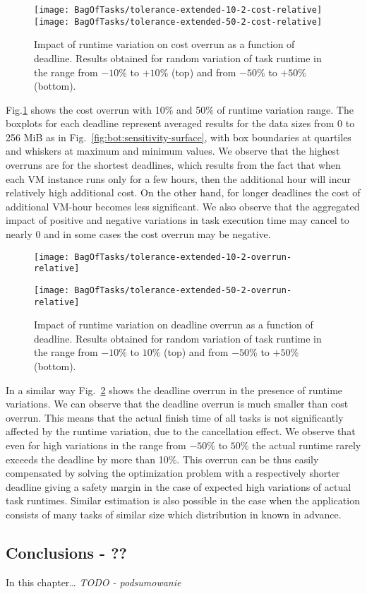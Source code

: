 {  \begin{figure}[tb]
     \centering
     \texttt{[image: BagOfTasks/tolerance-extended-10-2-cost-relative]}  
     \texttt{[image: BagOfTasks/tolerance-extended-50-2-cost-relative]}  
 	   \caption{Impact of runtime variation on cost overrun as a function of deadline. 
 	   Results obtained for random variation of task runtime in the range from $-10\%$ to $+10\%$ (top)
 	   and from $-50\%$ to $+50\%$ (bottom). }
 	   \label{fig:bot:dynamic-cost}
  \end{figure} 
  
  Fig.\ref{fig:bot:dynamic-cost} shows the cost overrun with 10\% and 50\%  of runtime
  variation range.  The boxplots for each deadline represent averaged
  results for the data sizes from 0 to 256 MiB as in
  Fig.~\ref{fig:bot:sensitivity-surface}, with box boundaries at quartiles
  and whiskers at maximum and minimum values. We observe that the highest
  overruns are for the shortest deadlines, which results from the fact that
  when each VM instance runs only for a few hours, then the additional hour
  will incur relatively high additional cost. On the other hand, for longer
  deadlines the cost of additional VM-hour becomes less significant. We also
  observe that the aggregated impact of positive and negative variations in
  task execution time may cancel to nearly $0$ and in some cases the cost
  overrun may be negative.

  \begin{figure}[tb]
     \centering
     \texttt{[image: BagOfTasks/tolerance-extended-10-2-overrun-relative]}  
     
   \texttt{[image: BagOfTasks/tolerance-extended-50-2-overrun-relative]}  
 	   \caption{Impact of runtime variation on deadline overrun as a function of deadline. 
 	   Results obtained for random variation of task runtime in the range from $ -10\%$ to $10\%$ (top)
 	   and from $-50\%$ to $+50\%$ (bottom). }
 	   \label{fig:bot:dynamic-time}
  \end{figure} 

  In a similar way Fig.~\ref{fig:bot:dynamic-time} shows the deadline overrun in
  the presence of runtime variations. We can observe that the deadline overrun
  is much smaller than cost overrun. This means that the actual finish time of
  all tasks is not significantly affected by the runtime variation, due to the
  cancellation effect. We observe that even for high variations in the range
  from $-50\%$ to $50\%$ the actual runtime rarely exceeds the deadline by
  more than 10\%. This overrun can be thus easily compensated by solving the
  optimization problem with a respectively shorter deadline giving a safety
  margin in the case of expected high variations of actual task runtimes. Similar estimation is also possible in the case when the application consists of many tasks of similar size which distribution in known in advance. 
	


\subsection{Conclusions - ??}

In this chapter… \emph{TODO - podsumowanie}
	
} %
